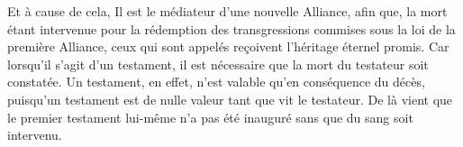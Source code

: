 Et à cause de cela, Il est le médiateur d'une nouvelle Alliance, afin que, la mort étant intervenue pour la rédemption des transgressions commises sous la loi de la première Alliance, ceux qui sont appelés reçoivent l'héritage éternel promis.
Car lorsqu'il s'agit d'un testament, il est nécessaire que la mort du testateur soit constatée.
Un testament, en effet, n'est valable qu'en conséquence du décès, puisqu'un testament est de nulle valeur tant que vit le testateur.
De là vient que le premier testament lui-même n'a pas été inauguré sans que du sang soit intervenu.